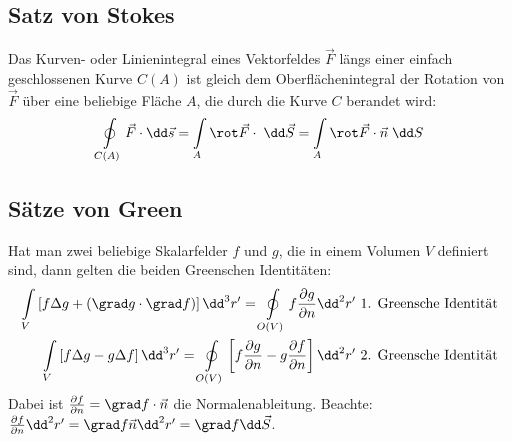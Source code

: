   \subsection{Satz von Stokes}
	  Das Kurven- oder Linienintegral eines Vektorfeldes $\vec{F}$ längs einer
	  einfach geschlossenen Kurve $C(A)$ ist gleich dem Oberflächenintegral der
	  Rotation von $\vec{F}$ über eine beliebige Fläche $A$, die durch die Kurve $C$
	  berandet wird:
	  \begin{equation}\label{stokes}
		  \oint\limits_{C(A)}\vec{F}\cdot \dd \vec{s}= \int\limits_{A}\rot\vec{F}\cdot \; \dd
		  \vec{S}= \int\limits_{A}\rot\vec{F}\cdot \vec{n}\; \dd S
	  \end{equation}
	  \subsection{Sätze von Green}
	  Hat man zwei beliebige Skalarfelder $f$ und $g$, die in einem Volumen $V$ definiert sind, dann gelten die beiden Greenschen Identitäten:
	  \begin{align}
	  	\int\limits_V \left[ f\Delta g + (\grad g\cdot \grad f) \right] \dd^3r' = \oint\limits_{O(V)} f\frac{\partial g}{\partial n} \dd^2r' \text{ 1. Greensche Identität}\label{green1} \\
	  	\int\limits_V \left[ f\Delta g - g \Delta f \right] \dd^3r' = \oint\limits_{O(V)} \left[ f \frac{\partial g}{\partial n} - g \frac{\partial f}{\partial n} \right] \dd^2r' \text{ 2. Greensche Identität} \label{green2}
	  \end{align}
	  Dabei ist $\frac{\partial f}{\partial n} = \grad f \cdot \vec{n}$ die Normalenableitung. Beachte: $\frac{\partial f}{\partial n}\dd^2r'=\grad f \vec{n}\dd^2r'=\grad f \dd\vec{S}$.
